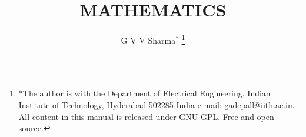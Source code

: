 \documentclass[journal,12pt,twocolumn]{IEEEtran}
\begin{document}
\makeatother
\let\StandardTheFigure\thefigure
\let\vec\mathbf
\renewcommand{\thefigure}{\theproblem}
\def\putbox#1#2#3{\makebox[0in][l]{\makebox[#1][l]{}\raisebox{\baselineskip}[0in][0in]{\raisebox{#2}[0in][0in]{#3}}}}
     \def\rightbox#1{\makebox[0in][r]{#1}}
     \def\centbox#1{\makebox[0in]{#1}}
     \def\topbox#1{\raisebox{-\baselineskip}[0in][0in]{#1}}
     \def\midbox#1{\raisebox{-0.5\baselineskip}[0in][0in]{#1}}
\vspace{3cm}
\title{
MATHEMATICS
}
\author{ G V V Sharma$^{*}$%
	\thanks{*The author is with the Department
		of Electrical Engineering, Indian Institute of Technology, Hyderabad
		502285 India e-mail:  gadepall@iith.ac.in. All content in this manual is released under GNU GPL.  Free and open source.}
	
}	
%
%
%
% 
%
\end{document}

